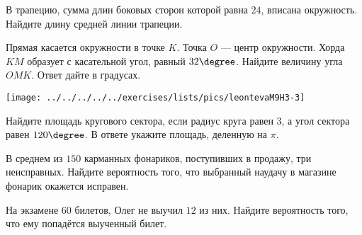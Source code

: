 \begin{homework}[number=3]
\begin{listofex}
		\item В трапецию, сумма длин боковых сторон которой равна \( 24 \), вписана окружность. Найдите длину средней линии трапеции.
		\item 
		\begin{minipage}[t]{\bodywidth}
			Прямая касается окружности в точке \( K \). Точка \( O \)  --- центр окружности. Хорда \( KM \) образует с касательной угол, равный \( 32\degree \). Найдите величину угла \( OMK \). Ответ дайте в градусах.
		\end{minipage}
		\hspace{0.02\linewidth}
		\begin{minipage}[t]{\picwidth}
				\texttt{[image: ../../../../../exercises/lists/pics/leontevaM9H3-3]}
		\end{minipage}
		\item Найдите площадь кругового сектора, если радиус круга равен \( 3 \), а угол сектора равен \( 120\degree \). В ответе укажите площадь, деленную на \( \pi \).
		\item В среднем из \( 150 \) карманных фонариков, поступивших в продажу,
		три неисправных. Найдите вероятность того, что выбранный наудачу
		в магазине фонарик окажется исправен.
		\item На экзамене \( 60 \) билетов, Олег не выучил \( 12 \) из них. Найдите вероятность того, что ему попадётся выученный билет.
	\end{listofex}
\end{homework}

